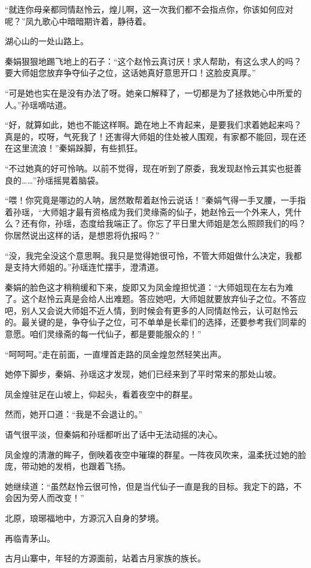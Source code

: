 \begin{this_body}
“就连你母亲都同情赵怜云，煌儿啊，这一次我们都不会指点你，你该如何应对呢？”凤九歌心中暗暗期许着，静待着。

湖心山的一处山路上。

秦娟狠狠地踢飞地上的石子：“这个赵怜云真讨厌！求人帮助，有这么求人的吗？要大师姐您放弃争夺仙子之位，这话她真好意思开口！这脸皮真厚。”

“可是她也实在是没有办法了呀。她亲口解释了，一切都是为了拯救她心中所爱的人。”孙瑶嘀咕道。

“好，就算如此，她也不能这样啊。跪在地上不肯起来，是要我们求着她起来吗？真是的，哎呀，气死我了！还害得大师姐的住处被人围观，有家都不能回，现在还在这里流浪！”秦娟跺脚，有些抓狂。

“不过她真的好可怜呐。以前不觉得，现在听到了原委，我发现赵怜云其实也挺善良的……”孙瑶摇晃着脑袋。

“喂！你究竟是哪边的人呐，居然敢帮着赵怜云说话！”秦娟气得一手叉腰，一手指着孙瑶，“大师姐才最有资格成为我们灵缘斋的仙子，她赵怜云一个外来人，凭什么？还有你，孙瑶，态度给我端正了。你忘了平日里大师姐是怎么照顾我们的吗？你居然说出这样的话，是想恩将仇报吗？”

“没，我完全没这个意思啊。我只是觉得她很可怜，不管大师姐做什么决定，我都是支持大师姐的。”孙瑶连忙摆手，澄清道。

秦娟的脸色这才稍稍缓和下来，旋即又为凤金煌担忧道：“大师姐现在左右为难了。这个赵怜云真是会给人出难题。答应她吧，大师姐就要放弃仙子之位。不答应吧，别人又会说大师姐不近人情，到时候会有更多的人同情赵怜云，认可赵怜云的。最关键的是，争夺仙子之位，可不单单是长辈们的选择，还要参考我们同辈的意愿。咱们灵缘斋的每一代仙子，都是要能服众的！”

“呵呵呵。”走在前面，一直埋首走路的凤金煌忽然轻笑出声。

她停下脚步，秦娟、孙瑶这才发现，她们已经来到了平时常来的那处山坡。

凤金煌驻足在山坡上，仰起头，看着夜空中的群星。

然而，她开口道：“我是不会退让的。”

语气很平淡，但秦娟和孙瑶都听出了话中无法动摇的决心。

凤金煌的清澈的眸子，倒映着夜空中璀璨的群星。一阵夜风吹来，温柔抚过她的脸庞，带动她的发梢，也跟着飞扬。

她继续道：“虽然赵怜云很可怜，但是当代仙子一直是我的目标。我定下的路，不会因为旁人而改变！”

北原，琅琊福地中，方源沉入自身的梦境。

再临青茅山。

古月山寨中，年轻的方源面前，站着古月家族的族长。


\end{this_body}
